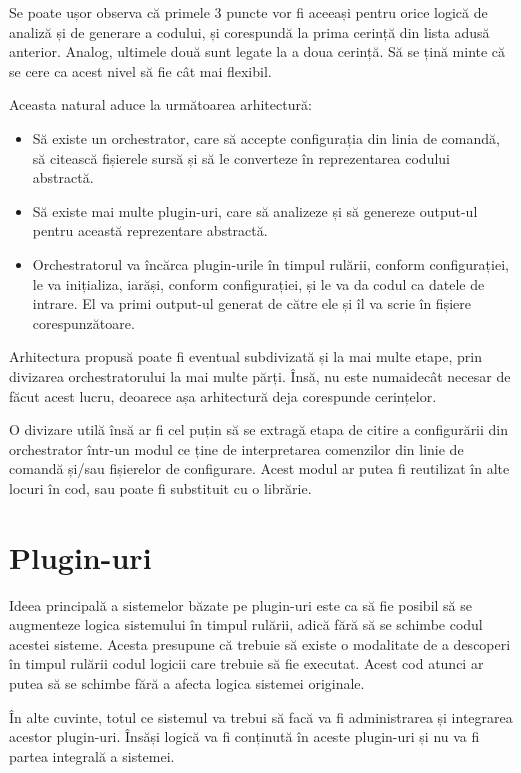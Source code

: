 \documentclass{report}
\begin{document}
Se poate ușor observa că primele 3 puncte vor fi aceeași pentru orice logică de analiză și de generare a codului, și corespundă la prima cerință din lista adusă anterior.
Analog, ultimele două sunt legate la a doua cerință.
Să se țină minte că se cere ca acest nivel să fie cât mai flexibil.

Aceasta natural aduce la următoarea arhitectură:

\begin{itemize}
  \item Să existe un orchestrator, care să accepte configurația din linia de comandă, să citească fișierele sursă și să le converteze în reprezentarea codului abstractă.
  \item Să existe mai multe plugin-uri, care să analizeze și să genereze output-ul pentru această reprezentare abstractă.
  \item Orchestratorul va încărca plugin-urile în timpul rulării, conform configurației, le va inițializa, iarăși, conform configurației, și le va da codul ca datele de intrare. El va primi output-ul generat de către ele și îl va scrie în fișiere corespunzătoare.
\end{itemize}

Arhitectura propusă poate fi eventual subdivizată și la mai multe etape, prin divizarea orchestratorului la mai multe părți.
Însă, nu este numaidecât necesar de făcut acest lucru, deoarece așa arhitectură deja corespunde cerințelor.

O divizare utilă însă ar fi cel puțin să se extragă etapa de citire a configurării din orchestrator într-un modul ce ține de interpretarea comenzilor din linie de comandă și/sau fișierelor de configurare.
Acest modul ar putea fi reutilizat în alte locuri în cod, sau poate fi substituit cu o librărie.

\section{Plugin-uri}

Ideea principală a sistemelor băzate pe plugin-uri este ca să fie posibil să se augmenteze logica sistemului în timpul rulării, adică fără să se schimbe codul acestei sisteme.
Acesta presupune că trebuie să existe o modalitate de a descoperi în timpul rulării codul logicii care trebuie să fie executat.
Acest cod atunci ar putea să se schimbe fără a afecta logica sistemei originale.

În alte cuvinte, totul ce sistemul va trebui să facă va fi administrarea și integrarea acestor plugin-uri.
Însăși logică va fi conținută în aceste plugin-uri și nu va fi partea integrală a sistemei.
\end{document}
